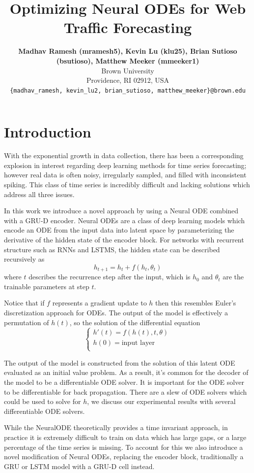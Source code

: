 \documentclass{article} %
\title{Optimizing Neural ODEs for Web Traffic Forecasting}
\author{\textbf{Madhav Ramesh (mramesh5), Kevin Lu (klu25), Brian Sutioso (bsutioso), Matthew Meeker (mmeeker1)
} \\
Brown University\\
Providence, RI 02912, USA \\
\texttt{\{madhav\_ramesh, kevin\_lu2, brian\_sutioso, matthew\_meeker\}@brown.edu}
}
\begin{document}
\maketitle

\section{Introduction}
With the exponential growth in data collection, there has been a corresponding explosion in interest regarding deep learning methods for time series forecasting; however real data is often noisy,  irregularly sampled, and filled with inconsistent spiking. This class of time series is incredibly difficult and lacking solutions which address all three issues.

In this work we introduce a novel approach by using a Neural ODE combined with a GRU-D encoder. Neural ODEs are a class of deep learning models which encode an ODE from the input data into latent space by parameterizing the derivative of the hidden state of the encoder block. For networks with recurrent structure such as RNNs and LSTMS, the hidden state can be described recursively as
\[h_{t+1} = h_t + f(h_t, \theta_t)\]
where $t$ describes the recurrence step after the input, which is $h_0$ and $\theta_t$ are the trainable parameters at step $t$.

Notice that if $f$ represents a gradient update to $h$ then this resembles Euler's discretization approach for ODEs. The output of the model is effectively a permutation of $h(t)$, so the solution of the differential equation
\[\begin{cases}
h'(t) = f(h(t), t, \theta)\\
h(0) = \text{input layer}\\
\end{cases}\]

The output of the model is constructed from the solution of this latent ODE evaluated as an initial value problem. As a result, it's common for the decoder of the model to be a differentiable ODE solver. It is important for the ODE solver to be differentiable for back propagation. There are a slew of ODE solvers which could be used to solve for $h$, we discuss our experimental results with several differentiable ODE solvers.

While the NeuralODE theoretically provides a time invariant approach, in practice it is extremely difficult to train on data which has large gaps, or a large percentage of the time series is missing. To account for this we also introduce a novel modification of Neural ODEs, replacing the encoder block, traditionally a GRU or LSTM model with a GRU-D cell instead. 
\end{document}
